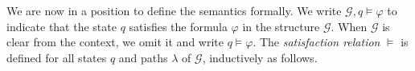 \documentclass[times, 10 pt,twocolumn]{article}
\newtheorem{definition}[theorem]{Definition}{\bfseries}{\rm}
\newcommand{\mc}[1]{\mathcal{#1}}
\begin{document}
\vspace{2mm}  We are now in a position to define the semantics
formally. We write $\mc{G}, q\models \varphi$ to indicate that the
state $q$ satisfies the formula $\varphi$ in the structure
$\mc{G}$. When $\mc{G}$ is clear from the context, we omit it and
write $q\models \varphi$. The \emph{satisfaction relation}
$\models$ is defined for all states $q$ and paths $\lambda$ of
$\mc{G}$, inductively as follows.
%
%
%
%
%
%
\end{document}
